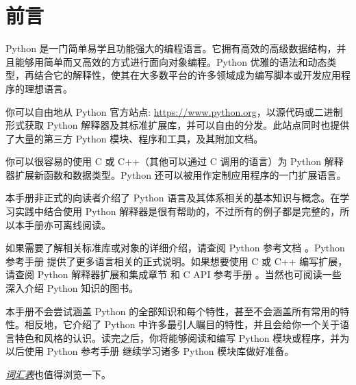 \chapter*{前言}
Python 是一门简单易学且功能强大的编程语言。它拥有高效的高级数据结构，并且能够用简单而又高效的方式进行面向对象编程。Python 优雅的语法和动态类型，再结合它的解释性，使其在大多数平台的许多领域成为编写脚本或开发应用程序的理想语言。

你可以自由地从 Python 官方站点: \url{https://www.python.org}，以源代码或二进制形式获取 Python 解释器及其标准扩展库，并可以自由的分发。此站点同时也提供了大量的第三方 Python 模块、程序和工具，及其附加文档。

你可以很容易的使用 C 或 C++（其他可以通过 C 调用的语言）为 Python 解释器扩展新函数和数据类型。Python 还可以被用作定制应用程序的一门扩展语言。

本手册非正式的向读者介绍了 Python 语言及其体系相关的基本知识与概念。在学习实践中结合使用 Python 解释器是很有帮助的，不过所有的例子都是完整的，所以本手册亦可离线阅读。

如果需要了解相关标准库或对象的详细介绍，请查阅 Python 参考文档 。Python 参考手册 提供了更多语言相关的正式说明。如果想要使用 C 或 C++ 编写扩展，请查阅 Python 解释器扩展和集成章节 和 C API 参考手册 。当然也可阅读一些深入介绍 Python 知识的图书。

本手册不会尝试涵盖 Python 的全部知识和每个特性，甚至不会涵盖所有常用的特性。相反地，它介绍了 Python 中许多最引人瞩目的特性，并且会给你一个关于语言特色和风格的认识。读完之后，你将能够阅读和编写 Python 模块或程序，并为以后使用 Python 参考手册 继续学习诸多 Python 模块库做好准备。

\href{https://docs.python.org/3/glossary.html}{\emph{词汇表}}也值得浏览一下。\\